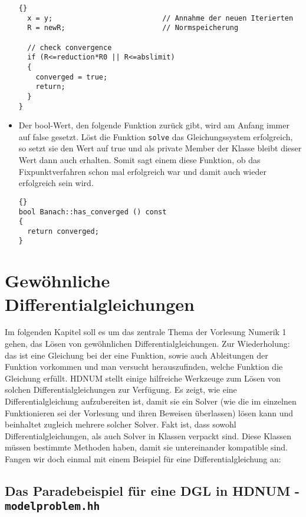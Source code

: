\documentclass[a4paper,11pt]{article}
\theoremstyle{definition}
\begin{document}
\begin{itemize}
{{\begin{lstlisting}{}
  x = y;                          // Annahme der neuen Iterierten
  R = newR;                       // Normspeicherung

  // check convergence
  if (R<=reduction*R0 || R<=abslimit)
  {
    converged = true;
    return;
  }
}
\end{lstlisting}}}

\item Der bool-Wert, den folgende Funktion zurück gibt, wird am Anfang
  immer auf false gesetzt. Löst die Funktion \lstinline{solve} das
  Gleichungssystem erfolgreich, so setzt sie den Wert auf true und als
  private Member der Klasse bleibt dieser Wert dann auch
  erhalten. Somit sagt einem diese Funktion, ob das Fixpunktverfahren
  schon mal erfolgreich war und damit auch wieder erfolgreich sein
  wird.

{\footnotesize{\begin{lstlisting}{}
bool Banach::has_converged () const
{
  return converged;
}
\end{lstlisting}}}
\end{itemize}



\section{Gewöhnliche Differentialgleichungen}

Im folgenden Kapitel soll es um das zentrale Thema der Vorlesung
Numerik 1 gehen, das Lösen von gewöhnlichen Differentialgleichungen.
Zur Wiederholung: das ist eine Gleichung bei der eine Funktion, sowie
auch Ableitungen der Funktion vorkommen und man versucht
herauszufinden, welche Funktion die Gleichung erfüllt. HDNUM stellt
einige hilfreiche Werkzeuge zum Lösen von solchen
Differentialgleichungen zur Verfügung.  Es zeigt, wie eine
Differentialgleichung aufzubereiten ist, damit sie ein Solver (wie die
im einzelnen Funktionieren sei der Vorlesung und ihren Beweisen
überlassen) lösen kann und beinhaltet zugleich mehrere solcher
Solver. Fakt ist, dass sowohl Differentialgleichungen, als auch Solver
in Klassen verpackt sind. Diese Klassen müssen bestimmte Methoden
haben, damit sie untereinander kompatible sind. Fangen wir doch einmal
mit einem Beispiel für eine Differentialgleichung an:

\subsection{Das Paradebeispiel für eine DGL in HDNUM - \lstinline{modelproblem.hh}}
\end{document}
